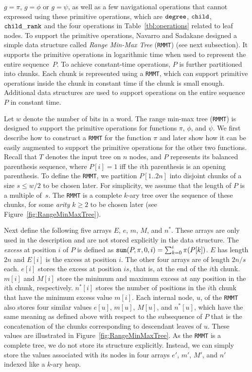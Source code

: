 $g = \pi$, $g = \phi$ or $g = \psi$, as well as a few navigational operations
that cannot expressed using these primitive operations, which are $\mathtt{degree}$,
$\mathtt{child}$, $\mathtt{child\_rank}$ and the four operations in Table~\ref{tbl:operations}
related to leaf nodes.
To support the primitive operations, Navarro and Sadakane designed a simple data
structure called \emph{Range Min-Max Tree} ({\tt RMMT}) (see next subsection).
It supports the primitive operations in logarithmic time when used to represent
the entire sequence~$P$.
To achieve constant-time operations, $P$ is further partitioned into chunks.
Each chunk is represented using a {\tt RMMT}, which can support primitive
operations inside the chunk in constant time if the chunk is small enough.
Additional data structures are used to support operations on the entire sequence
$P$ in constant time.

Let $w$ denote the number of bits in a word.
The range min-max tree ({\tt RMMT}) is designed to support the primitive
operations for functions $\pi$, $\phi$, and $\psi$.
We first describe how to construct a {\tt RMMT} for the function $\pi$ and
later show how it can be easily augmented to support the primitive operations
for the other two functions.
Recall that $T$ denotes the input tree on $n$ nodes, and $P$ represents its
balanced parenthesis sequence, where $P[i] = 1$ iff the $i$th
parenthesis is an opening parenthesis.
To define the {\tt RMMT}, we partition $P[1..2n]$ into disjoint chunks of
a size $s \le w/2$ to be chosen later.
For simplicity, we assume that the length of $P$ is a multiple of~$s$.
The {\tt RMMT} is a complete $k$-ary tree over the sequence of these chunks,
for some \emph{arity} $k \ge 2$ to be chosen later (see
Figure~\ref{fig:RangeMinMaxTree}).

Next define the following five arrays $E$, $e$, $m$, $M$, and $n^*$.
These arrays are only used in the description and are not stored explicitly
in the data structure.
The {\em excess} at position $i$ of $P$ is defined as $\mathtt{sum}(P,\pi,0,i) =
\sum_{k=0}^{i} \pi(P[k])$.
$E$ has length $2n$ and $E[i]$ is the excess at position $i$.
The other four arrays are of length $2n/s$ each.
$e[i]$ stores the excess at position $is$, that is, at the end of the $i$th
chunk.
$m[i]$ and $M[i]$ store the minimum and maximum excess at any position in the
$i$th chunk, respectively.
$n^*[i]$ stores the number of positions in the $i$th chunk that have the
minimum excess value $m[i]$.
Each internal node, $u$, of the {\tt RMMT} also stores four similar values
$e[u]$, $m[u]$, $M[u]$, and $n^*[u]$, which have the same meaning as defined
above with respect to the subsequence of $P$ that is the concatenation of the
chunks corresponding to descendant leaves of $u$.
These values are illustrated in Figure~\ref{fig:RangeMinMaxTree}.
As the {\tt RMMT} is a complete tree, we do not store its structure explicitly.
Instead, we can simply store the values associated with its nodes in four arrays
$e'$, $m'$, $M'$, and $n'$ indexed like a $k$-ary heap.

